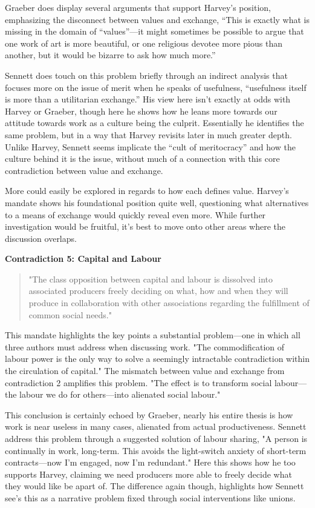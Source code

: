 \documentclass[12pt,a4paper]{article}
\begin{document}
Graeber does display several arguments that support Harvey’s position, emphasizing the disconnect between values and exchange, “This is exactly what is missing in the domain of “values”---it might sometimes be possible to argue that one work of art is more beautiful, or one religious devotee more pious than another, but it would be bizarre to ask how much more.” \cite{bs}
\vspace*{10pt}

Sennett does touch on this problem briefly through an indirect analysis that focuses more on the issue of merit when he speaks of usefulness, “usefulness itself is more than a utilitarian exchange.” \cite{new} His view here isn’t exactly at odds with Harvey or Graeber, though here he shows how he leans more towards our attitude towards work as a culture being the culprit. Essentially he identifies the same problem, but in a way that Harvey revisits later in much greater depth. Unlike Harvey, Sennett seems implicate the “cult of meritocracy” \cite{new} and how the culture behind it is the issue, without much of a connection with this core contradiction between value and exchange.

More could easily be explored in regards to how each defines value. Harvey's mandate shows his foundational position quite well, questioning what alternatives to a means of exchange would quickly reveal even more. While further investigation would be fruitful, it's best to move onto other areas where the discussion overlaps. 

\textbf{Contradiction 5: Capital and Labour}
\begin{quotation} {\color{G-Moon}
    \noindent "The class opposition between capital and labour is dissolved into associated producers freely deciding on what, how and when they will produce in collaboration with other associations regarding the fulfillment of common social needs." \cite{con}}
\end{quotation}
This mandate highlights the key points a substantial problem---one in which all three authors must address when discussing work. "The commodification of labour power is the only way to solve a seemingly intractable contradiction within the circulation of capital." \cite{con} The mismatch between value and exchange from contradiction 2 amplifies this problem. "The effect is to transform social labour---the labour we do for others---into alienated social labour." \cite{con} 
\vspace*{10pt}

This conclusion is certainly echoed by Graeber, nearly his entire thesis is how work is near useless in many cases, alienated from actual productiveness. Sennett address this problem through a suggested solution of labour sharing, "A person is continually in work, long-term. This avoids the light-switch anxiety of short-term contracts---now I’m engaged, now I’m redundant." \cite{new} Here this shows how he too supports Harvey, claiming we need producers more able to freely decide what they would like be apart of. The difference again though, highlights how Sennett see's this as a narrative problem fixed through social interventions like unions.
\end{document}
